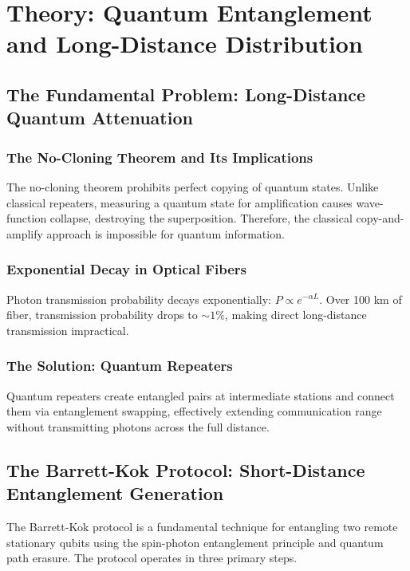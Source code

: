 \section{Theory: Quantum Entanglement and Long-Distance Distribution}

\subsection{The Fundamental Problem: Long-Distance Quantum Attenuation}

\subsubsection{The No-Cloning Theorem and Its Implications}

The no-cloning theorem prohibits perfect copying of quantum states. Unlike classical repeaters, measuring a quantum state for amplification causes wave-function collapse, destroying the superposition. Therefore, the classical copy-and-amplify approach is impossible for quantum information.

\subsubsection{Exponential Decay in Optical Fibers}

Photon transmission probability decays exponentially: $P \propto e^{-\alpha L}$. Over 100 km of fiber, transmission probability drops to $\sim 1\%$, making direct long-distance transmission impractical.

\subsubsection{The Solution: Quantum Repeaters}

Quantum repeaters create entangled pairs at intermediate stations and connect them via entanglement swapping, effectively extending communication range without transmitting photons across the full distance.

\subsection{The Barrett-Kok Protocol: Short-Distance Entanglement Generation}

The Barrett-Kok protocol is a fundamental technique for entangling two remote stationary qubits using the spin-photon entanglement principle and quantum path erasure. The protocol operates in three primary steps.

